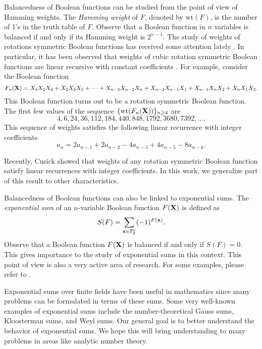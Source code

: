 Balancedness of Boolean functions can be studied from the point of view of Hamming weights.   The {\it Hamming weight} of $F$, denoted by $\text{wt}(F)$, is the number of 1's in the truth table of $F$.  Observe that a Boolean function in $n$ variables is balanced if and only if its Hamming weight 
is $2^{n-1}$.  The study of weights of rotations symmetric Boolean functions has received some attention lately 
\cite{BCP, cusickjohns, cusickstanica,stanicamaitra}.  In particular, it has been observed that weights of cubic  rotation symmetric Boolean functions are linear recursive with constant coefficients 
\cite{BCP, cusickjohns}.   For example, consider the Boolean function
$$F_n({\bf X}) = X_1X_2X_4+X_2X_3X_5+\cdots+X_{n-3}X_{n-2}X_n+X_{n-2}X_{n-1}X_1+X_{n-1}X_{n}X_2+X_{n}X_{1}X_3.$$
This Boolean function turns out to be a rotation symmetric Boolean function.  The first few values of the sequence $\{\text{wt}(F_n({\bf X}))\}_{n\geq 4}$
are
$$4, 6, 24, 36, 112, 184, 440, 848, 1792, 3680, 7392,\ldots.$$
This sequence of weights satisfies the following linear recurrence with integer coefficients
\begin{equation}
a_n = 2a_{n-1}+ 2a_{n-2} -4a_{n-3}+ 4a_{n-5} -8a_{n-6}.
\end{equation}

Recently, Cusick \cite{cusickArXiv} showed that weights of any rotation symmetric Boolean function satisfy linear recurrences with integer coefficients. 
In this work, we generalize part of this result to other characteristics.

Balancedness of Boolean functions can also be linked to exponential sums. The {\it exponential sum} of an $n$-variable Boolean function $F({\bf X})$ is defined as
\begin{equation}
 S(F)=\sum_{{\bf x}\in \mathbb{F}_2^n} (-1)^{F({\bf x})}.
\end{equation}
Observe that a Boolean function $F({\bf X})$ is balanced if and only if $S(F)=0$.  This gives importance to the study of exponential sums in this context.  This point of view is also a very active area of research. For 
some examples, please refer to \cite{sperber, ax, cgm3, cm1, cm2, cm3, cusick4, fspectrum, mm1, mm, fdegree}.  

Exponential sums over finite fields have been useful in mathematics since many problems can be formulated in terms of these sums.  Some very well-known examples of exponential sums include the number-theoretical Gauss sums, Kloosterman sums, and Weyl sums.
Our general goal is to better understand the behavior of exponential sums.  We hope  this will bring understanding 
 to many problems in areas like analytic number theory. 


